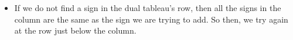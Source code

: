 \documentclass[12pt]{article}
\numberwithin{equation}{section}
\newcommand{\horizontalDominoMaybe}[3]{\filldraw [dominoMaybeStyle] (#2 - 1 + \eps, #1 - 1 + \eps) rectangle + (2 - \teps, 1 -\teps) node [dominoText] {$#3$};}
\newcommand{\horizontalDominoMaybeShift}[4]{\filldraw [dominoMaybeStyle] (#2 - 1 + #4 + \eps, #1 - 1 + \eps) rectangle + (2 - \teps, 1 -\teps) node [dominoText] {$#3$};}
\newcommand{\greenCircle}[2]{\filldraw[green] (#2 - .5, #1 - .5) circle (.2cm);}
\begin{document}
\begin{itemize}
\begin{itemize}
\begin{figure}[H]
      \end{figure}
      \item If we do not find a sign in the dual tableau's row, then all the signs in the column are the same as the sign we are trying to add.
      So then, we try again at the row just below the column.
      \begin{figure}[H]
        \centering
      \end{figure}
    \end{itemize}
  \end{itemize}
\end{document}
